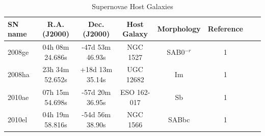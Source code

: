 \documentclass[preprint]{aastex}
\begin{document}
\begin{table}[htc]
\begin{center}
\caption{Supernovae Host Galaxies} 
\begin{tabular}{l*{6}{c}r}
\hline\hline
SN name & R.A. (J2000) & Dec. (J2000) & Host Galaxy  & Morphology & Reference  \\%
\hline
2008ge   & 04h 08m 24.686s & -47d 53m 46.93s    & NGC 1527           & SAB0$^{-r}$     & 1 \\%
2008ha   & 23h 34m 52.652s   & +18d 13m 35.14s     & UGC 12682         &  Im                    & 1 \\%
2010ae   & 07h 15m 54.698s   & -57d 20m 36.95s      & ESO 162-017  & Sb & 1 \\%
2010el    & 04h 19m 58.816s   & -54d 56m 38.90s      & NGC 1566           & SABbc           & 1 \\%
\hline
\end{tabular}
\label{tab:multicol}
\end{center}
\end{table}
\end{document}
